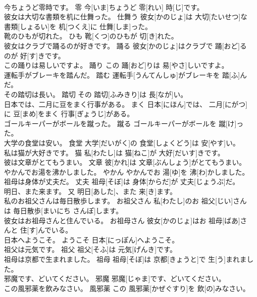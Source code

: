 \documentclass[8pt]{extreport}
\begin{document}
\begin{CJK}{UTF8}{min}
\\	今ちょうど零時です。	零	今[いま]ちょうど 零[れい] 時[じ]です。	
\\	彼女は大切な書類を机に仕舞った。	仕舞う	彼女[かのじょ]は 大切[たいせつ]な 書類[しょるい]を 机[つくえ]に 仕舞[しま]った。	
\\	靴のひもが切れた。	ひも	靴[くつ]のひもが 切[き]れた。	
\\	彼女はクラブで踊るのが好きです。	踊る	彼女[かのじょ]はクラブで 踊[おど]るのが 好[す]きです。	
\\	この踊りは易しいですよ。	踊り	この 踊[おど]りは 易[やさ]しいですよ。	
\\	運転手がブレーキを踏んだ。	踏む	運転手[うんてんしゅ]がブレーキを 踏[ふ]んだ。	
\\	その踏切は長い。	踏切	その 踏切[ふみきり]は 長[なが]い。	
\\	日本では、二月に豆をまく行事がある。	まく	日本[にほん]では、 二月[にがつ]に 豆[まめ]をまく 行事[ぎょうじ]がある。	
\\	ゴールキーパーがボールを蹴った。	蹴る	ゴールキーパーがボールを 蹴[け]った。	
\\	大学の食堂は安い。	食堂	大学[だいがく]の 食堂[しょくどう]は 安[やす]い。	
\\	私は猫が大好きです。	猫	私[わたし]は 猫[ねこ]が 大好[だいす]きです。	
\\	彼は文章がとてもうまい。	文章	彼[かれ]は 文章[ぶんしょう]がとてもうまい。	
\\	やかんでお湯を沸かしました。	やかん	やかんでお 湯[ゆ]を 沸[わ]かしました。	
\\	祖母は身体が丈夫だ。	丈夫	祖母[そぼ]は 身体[からだ]が 丈夫[じょうぶ]だ。	
\\	明日、また来ます。	又	明日[あした]、また 来[き]ます。	
\\	私のお祖父さんは毎日散歩します。	お祖父さん	私[わたし]のお 祖父[じい]さんは 毎日散歩[まいにち さんぽ]します。	
\\	彼女はお祖母さんと住んでいる。	お祖母さん	彼女[かのじょ]はお 祖母[ばあ]さんと 住[す]んでいる。	
\\	日本へようこそ。	ようこそ	日本[にっぽん]へようこそ。	
\\	祖父は元気です。	祖父	祖父[そふ]は 元気[げんき]です。	
\\	祖母は京都で生まれました。	祖母	祖母[そぼ]は 京都[きょうと]で 生[う]まれました。	
\\	邪魔です、どいてください。	邪魔	邪魔[じゃま]です、どいてください。	
\\	この風邪薬を飲みなさい。	風邪薬	この 風邪薬[かぜぐすり]を 飲[の]みなさい。	

\end{CJK}
\end{document}
